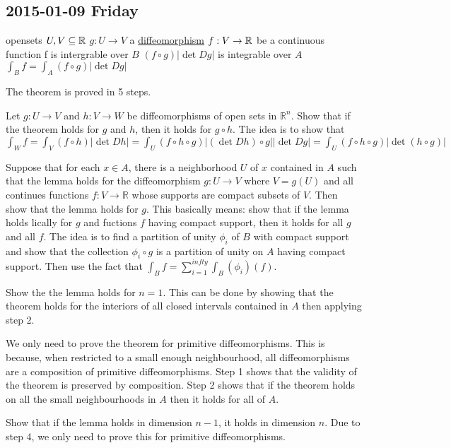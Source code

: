 
\subsection{2015-01-09 Friday}

 
\begin{tTheorem}
\tLET
opensets $U, V \subseteq {\mathbb R}$\newline
$g: U\to V$ a \hyperref[kw:diffeomorphism]{diffeomorphism}\newline
$f:V\to {\mathbb R}$ be a continuous function
\tTHEN f is intergrable over $B$\newline
  \IFF $(f\circ g)|\det D g|$ is integrable over $A$
\tNOTE $\int_B f = \int_A(f\circ g)|\det D g|$
\end{tTheorem}
\IDEA The theorem is proved in 5 steps.

\begin{myenumerate}
\item Let $g: U \to V$ and $h: V \to W$ be diffeomorphisms of open sets in $\mathbb{R}^n$. Show that if the theorem holds for $g$ and $h$, then it holds for $g \circ h$. The idea is to show that $\int_W f = \int_V (f \circ h)|\det Dh| = \int_U (f \circ h \circ g)|(\det Dh) \circ g| |\det Dg| = \int_U (f \circ h \circ g)|\det (h \circ g)|$
\item Suppose that for each $x \in A$, there is a neighborhood $U$ of $x$ contained in $A$ such that the lemma holds for the diffeomorphism $g: U \to V$ where $V = g(U)$ and all continues functions $f: V \to \mathbb{R}$ whose supports are compact subsets of $V$. Then show that the lemma holds for $g$. This basically means: show that if the lemma holds lically for $g$ and fuctions $f$ having compact support, then it holds for all $g$ and all $f$. The idea is to find a partition of unity ${\phi_i}$ of $B$ with compact support and show that the collection ${\phi_i \circ g}$ is a partition of unity on $A$ having compact support. Then use the fact that $\int_B f = \sum_{i = 1}^{infty} \int_B (\phi_i)(f)$.
\item Show the the lemma holds for $n = 1$. This can be done by showing that the theorem holds for the interiors of all closed intervals contained in $A$ then applying step 2.
\item We only need to prove the theorem for primitive diffeomorphisms. This is because, when restricted to a small enough neighbourhood, all diffeomorphisms are a composition of primitive diffeomorphisms. Step 1 shows that the validity of the theorem is preserved by composition. Step 2 shows that if the theorem holds on all the small neighbourhoods in $A$ then it holds for all of $A$.
\item Show that if the lemma holds in dimension $n-1$, it holds in dimension $n$. Due to step 4, we only need to prove this for primitive diffeomorphisms. 
\end{myenumerate}



